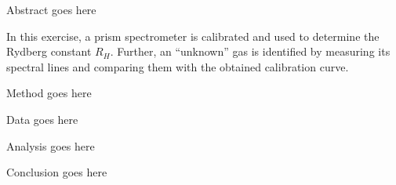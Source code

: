 
\physics

\begin{paperabs}
Abstract goes here
\end{paperabs}

\begin{paper}

In this exercise, a prism spectrometer is calibrated and used to determine the Rydberg constant \( R_H \). Further, an ``unknown'' gas is identified by measuring its spectral lines and comparing them with the obtained calibration curve. \\




Method goes here


Data goes here


Analysis goes here


Conclusion goes here
\end{paper}
